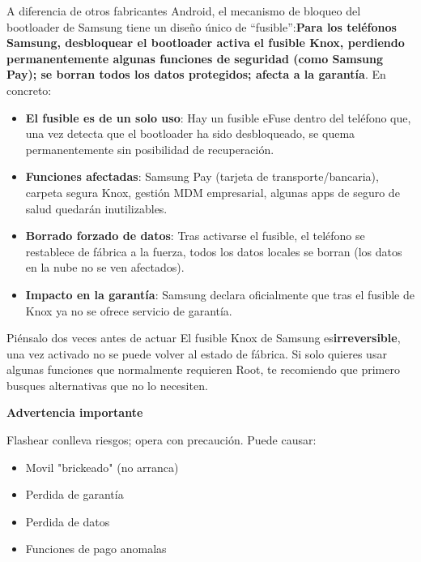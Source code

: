 
A diferencia de otros fabricantes Android, el mecanismo de bloqueo del bootloader de Samsung tiene un diseño único de “fusible”:\textbf{Para los teléfonos Samsung, desbloquear el bootloader activa el fusible Knox, perdiendo permanentemente algunas funciones de seguridad (como Samsung Pay); se borran todos los datos protegidos; afecta a la garantía}. En concreto:

\begin{itemize}
  \item \textbf{El fusible es de un solo uso}: Hay un fusible eFuse dentro del teléfono que, una vez detecta que el bootloader ha sido desbloqueado, se quema permanentemente sin posibilidad de recuperación.
  \item \textbf{Funciones afectadas}: Samsung Pay (tarjeta de transporte/bancaria), carpeta segura Knox, gestión MDM empresarial, algunas apps de seguro de salud quedarán inutilizables.
  \item \textbf{Borrado forzado de datos}: Tras activarse el fusible, el teléfono se restablece de fábrica a la fuerza, todos los datos locales se borran (los datos en la nube no se ven afectados).
  \item \textbf{Impacto en la garantía}: Samsung declara oficialmente que tras el fusible de Knox ya no se ofrece servicio de garantía.
\end{itemize}

\begin{tcbwarn}{Piénsalo dos veces antes de actuar}
El fusible Knox de Samsung es\textbf{irreversible}, una vez activado no se puede volver al estado de fábrica. Si solo quieres usar algunas funciones que normalmente requieren Root, te recomiendo que primero busques alternativas que no lo necesiten.

\end{tcbwarn}

\textbf{Advertencia importante}\par

Flashear conlleva riesgos; opera con precaución. Puede causar:

\begin{itemize}
  \item Movil "brickeado" (no arranca)
  \item Perdida de garantía
  \item Perdida de datos
  \item Funciones de pago anomalas
\end{itemize}

